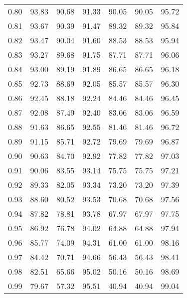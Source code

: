 \begin{tabular}{|c|c|c|c|c|c|c|}
      0.80 &     93.83 &     90.68 &      91.33 &   90.05 &      90.05 &         95.72 \\
      0.81 &     93.67 &     90.39 &      91.47 &   89.32 &      89.32 &         95.84 \\
      0.82 &     93.47 &     90.04 &      91.60 &   88.53 &      88.53 &         95.94 \\
      0.83 &     93.27 &     89.68 &      91.75 &   87.71 &      87.71 &         96.06 \\
      0.84 &     93.00 &     89.19 &      91.89 &   86.65 &      86.65 &         96.18 \\
      0.85 &     92.73 &     88.69 &      92.05 &   85.57 &      85.57 &         96.30 \\
      0.86 &     92.45 &     88.18 &      92.24 &   84.46 &      84.46 &         96.45 \\
      0.87 &     92.08 &     87.49 &      92.40 &   83.06 &      83.06 &         96.59 \\
      0.88 &     91.63 &     86.65 &      92.55 &   81.46 &      81.46 &         96.72 \\
      0.89 &     91.15 &     85.71 &      92.72 &   79.69 &      79.69 &         96.87 \\
      0.90 &     90.63 &     84.70 &      92.92 &   77.82 &      77.82 &         97.03 \\
      0.91 &     90.06 &     83.55 &      93.14 &   75.75 &      75.75 &         97.21 \\
      0.92 &     89.33 &     82.05 &      93.34 &   73.20 &      73.20 &         97.39 \\
      0.93 &     88.60 &     80.52 &      93.53 &   70.68 &      70.68 &         97.56 \\
      0.94 &     87.82 &     78.81 &      93.78 &   67.97 &      67.97 &         97.75 \\
      0.95 &     86.92 &     76.78 &      94.02 &   64.88 &      64.88 &         97.94 \\
      0.96 &     85.77 &     74.09 &      94.31 &   61.00 &      61.00 &         98.16 \\
      0.97 &     84.42 &     70.71 &      94.66 &   56.43 &      56.43 &         98.41 \\
      0.98 &     82.51 &     65.66 &      95.02 &   50.16 &      50.16 &         98.69 \\
      0.99 &     79.67 &     57.32 &      95.51 &   40.94 &      40.94 &         99.04 \\
\bottomrule
\end{tabular}
